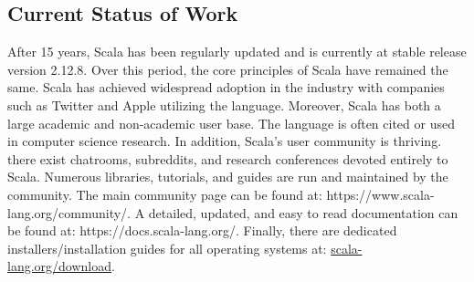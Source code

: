 \documentclass[jou,apacite]{IEEEtran}
\begin{document}
\subsection{Current Status of Work}
After 15 years, Scala has been regularly updated and is currently at stable
release version 2.12.8. Over this period, the core principles of Scala have
remained the same. Scala has achieved widespread adoption in the industry with
companies such as Twitter and Apple utilizing the language. Moreover, Scala has
both a large academic and non-academic user base. The language is often cited or
used in computer science research. In addition, Scala's user community is
thriving. there exist chatrooms, subreddits, and research conferences devoted
entirely to Scala. Numerous libraries, tutorials, and guides are run and
maintained by the community. The main community page can be found at:
https://www.scala-lang.org/community/. A detailed, updated, and easy to read
documentation can be found at: https://docs.scala-lang.org/. Finally, there are
dedicated installers/installation guides for all operating systems at:
\href{https://www.scala-lang.org/download/}{scala-lang.org/download}.




\end{document}
